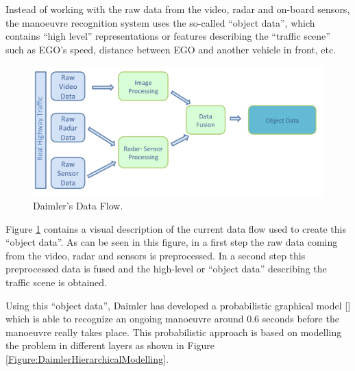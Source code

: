 Instead of working with the raw data from the video, radar and on-board sensors, the manoeuvre recognition system uses the so-called ``object data'', which contains ``high level'' representations or features describing the ``traffic scene'' such as EGO's speed, distance between EGO and another vehicle in front, etc.  
\begin{figure}
\begin{center}
\includegraphics[scale=0.35]{./figures/DaimlerDataFlow}
\caption{\label{Figure:DaimlerDataFlow} Daimler's Data Flow.}
\end{center}
\end{figure}

Figure \ref{Figure:DaimlerDataFlow} contains a visual description of the current data flow used to create this ``object data''.  As can be seen in this figure, in a first step the raw data coming from the video, radar and sensors is preprocessed. In a second step this preprocessed data is fused and the high-level or ``object data'' describing the traffic scene is obtained. 

Using this ``object data'', Daimler has developed a probabilistic graphical model [] which is able to recognize an ongoing manoeuvre around 0.6 seconds before the manoeuvre really takes place. This probabilistic approach is based on modelling the problem in different layers as shown in Figure \ref{Figure:DaimlerHierarchicalModelling}.



